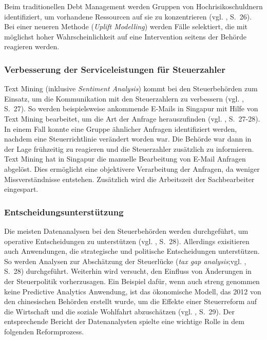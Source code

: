 Beim traditionellen Debt Management werden Gruppen von Hochrisikoschuldnern identifiziert, um vorhandene Ressourcen auf sie zu
konzentrieren (vgl. \cite{OECD}, S.~26). Bei einer neueren Methode (\emph{Uplift Modelling}) werden Fälle selektiert, die
mit möglichst hoher Wahrscheinlichkeit auf eine Intervention seitens der Behörde reagieren werden. 

\subsubsection{Verbesserung der Serviceleistungen für Steuerzahler}

Text Mining (inklusive \emph{Sentiment Analysis}) kommt bei den Steuerbehörden zum Einsatz, um die Kommunikation mit den
Steuerzahlern zu verbessern (vgl. \cite{OECD}, S.~27). So werden beispielsweise ankommende E-Mails in Singapur mit Hilfe
von Text Mining bearbeitet, um die Art der Anfrage herauszufinden (vgl. \cite{OECD}, S.~27-28). In einem Fall konnte eine
Gruppe ähnlicher Anfragen identifiziert werden, nachdem eine Steuerrichtlinie verändert worden war. Die Behörde war dann in
der Lage frühzeitig zu reagieren und die Steuerzahler zusätzlich zu informieren. Text Mining hat in Singapur die manuelle
Bearbeitung von E-Mail Anfragen abgelöst. Dies ermöglicht eine objektivere Verarbeitung der Anfragen, da weniger Missverständnisse
entstehen. Zusätzlich wird die Arbeitszeit der Sachbearbeiter eingespart.

\subsubsection{Entscheidungsunterstützung}

Die meisten Datenanalysen bei den Steuerbehörden werden durchgeführt, um operative
Entscheidungen zu unterstützen (vgl. \cite{OECD}, S.~28). Allerdings exisitieren auch
Anwendungen, die strategische und politische Entscheidungen unterstützen. So werden
Analysen zur Abschätzung der Steuerlücke (\emph{tax gap analysis};vgl. \cite{OECD}, S.~28) durchgeführt.
Weiterhin wird versucht, den Einfluss von Änderungen in der Steuerpolitik vorherzusagen. Ein Beispiel
dafür, wenn auch streng genommen keine Predictive Analytics Anwendung, ist das ökonomische Modell, das
2012 von den chinesischen Behörden erstellt wurde, um die Effekte einer Steuerreform auf die Wirtschaft
und die soziale Wohlfahrt abzuschätzen (vgl. \cite{OECD}, S.~29). Der entsprechende Bericht der
Datenanalysten spielte eine wichtige Rolle in dem folgenden Reformprozess.


